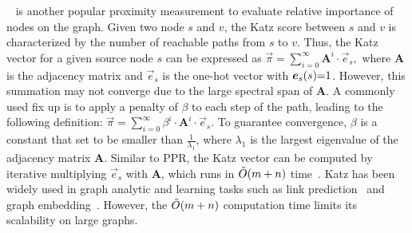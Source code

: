 ~\cite{katz1953Katz} is another popular proximity measurement to evaluate relative importance of nodes on the graph. Given two node $s$ and $v$, the Katz score between $s$ and $v$ is characterized by the number of reachable paths from $s$ to $v$. Thus, the Katz vector for a given source node $s$ can be expressed as $\vec{\pi}=\sum_{i=0}^\infty \mathbf{A}^{i} \cdot \vec{e}_s,$ where $\mathbf{A} $ is the adjacency matrix and $\vec{e}_s$ is the one-hot vector with $\vec{e}_s(s)\hspace{-1mm} =\hspace{-1mm} 1$. However, this summation may not converge due to the large spectral span of $\mathbf{A}$. A commonly used fix up is to apply a penalty of $\beta$ to each step of the path, leading to the following definition: $\vec{\pi}=\sum_{i=0}^\infty \beta^i \cdot \mathbf{A}^{i} \cdot \vec{e}_s$. 
To guarantee convergence, $\beta$ is a constant that set to be smaller than $\frac{1}{\lambda_1}$, where $\lambda_1$ is  the largest eigenvalue of the adjacency matrix $\mathbf{A}$. 
Similar to PPR, the Katz vector can be computed by iterative multiplying $\vec{e}_s$ with $\mathbf{A}$, which runs in $\Tilde{O}(m+n)$ time~\cite{foster2001faster}.  Katz has been widely used in graph analytic and learning tasks such as link prediction~\cite{Liben2003link} and graph embedding~\cite{ou2016asymmetric}. However, the $\Tilde{O}(m+n)$ computation time limits its scalability on large graphs. 




